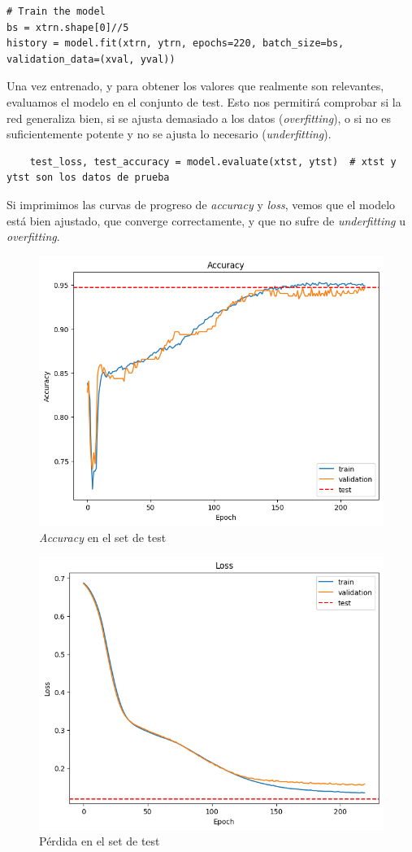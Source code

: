 \documentclass[paper=a4, fontsize=11pt]{scrartcl} %
\numberwithin{equation}{section} %
\numberwithin{figure}{section} %
\numberwithin{table}{section} %
\begin{document}
\begin{verbatim}
# Train the model
bs = xtrn.shape[0]//5
history = model.fit(xtrn, ytrn, epochs=220, batch_size=bs, validation_data=(xval, yval))
\end{verbatim}

Una vez entrenado, y para obtener los valores que realmente son relevantes, evaluamos el modelo en el conjunto de test. Esto nos permitirá comprobar si la red generaliza bien, si se ajusta demasiado a los datos (\textit{overfitting}), o si no es suficientemente potente y no se ajusta lo necesario (\textit{underfitting}).

\begin{verbatim}
    test_loss, test_accuracy = model.evaluate(xtst, ytst)  # xtst y ytst son los datos de prueba
\end{verbatim}

Si imprimimos las curvas de progreso de \textit{accuracy} y \textit{loss}, vemos que el modelo está bien ajustado, que converge correctamente, y que no sufre de \textit{underfitting} u \textit{overfitting}.


\begin{figure}[H]
  \centering
  \includegraphics[width=.6\linewidth]{images/accuracy_output.png}
  \caption{\textit{Accuracy} en el set de test}
  \label{fig:sub1}
\end{figure}

\begin{figure}[H]
  \centering
  \includegraphics[width=.6\linewidth]{images/loss_output.png}
  \caption{Pérdida en el set de test}
  \label{fig:sub2}
\end{figure}
\end{document}
